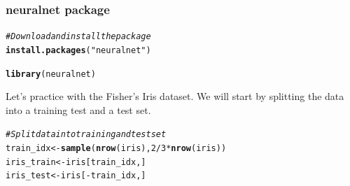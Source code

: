 \documentclass[6pt,letter]{article}\usepackage[]{graphicx}\usepackage[]{color}
\makeatletter
\newcommand{\hlnum}[1]{\textcolor[rgb]{0.686,0.059,0.569}{#1}}%
\newcommand{\hlstr}[1]{\textcolor[rgb]{0.192,0.494,0.8}{#1}}%
\newcommand{\hlcom}[1]{\textcolor[rgb]{0.678,0.584,0.686}{\textit{#1}}}%
\newcommand{\hlopt}[1]{\textcolor[rgb]{0,0,0}{#1}}%
\newcommand{\hlstd}[1]{\textcolor[rgb]{0.345,0.345,0.345}{#1}}%
\newcommand{\hlkwb}[1]{\textcolor[rgb]{0.69,0.353,0.396}{#1}}%
\newcommand{\hlkwd}[1]{\textcolor[rgb]{0.737,0.353,0.396}{\textbf{#1}}}%
\newenvironment{kframe}{%
 \def\at@end@of@kframe{}%
 \ifinner\ifhmode%
  \def\at@end@of@kframe{\end{minipage}}%
  \begin{minipage}{\columnwidth}%
 \fi\fi%
 \def\FrameCommand##1{\hskip\@totalleftmargin \hskip-\fboxsep
 \colorbox{shadecolor}{##1}\hskip-\fboxsep
     \hskip-\linewidth \hskip-\@totalleftmargin \hskip\columnwidth}%
 \MakeFramed {\advance\hsize-\width
   \@totalleftmargin\z@ \linewidth\hsize
   \@setminipage}}%
 {\par\unskip\endMakeFramed%
 \at@end@of@kframe}
\newenvironment{knitrout}{}{} %
\makeatother
\begin{document}
\subsubsection{neuralnet package}
\begin{knitrout}
\color{fgcolor}\begin{kframe}
\begin{alltt}
\hlcom{#Download and install the package}
\hlkwd{install.packages}\hlstd{(}\hlstr{"neuralnet"}\hlstd{)}
\end{alltt}


{\ttfamily\noindent\itshape\color{messagecolor}{\#\# Installing package into 'C:/Users/adrie/OneDrive/Documents/R/win-library/3.6'\\\#\# (as 'lib' is unspecified)}}

{\ttfamily\noindent\bfseries{}}\begin{alltt}
\hlkwd{library}\hlstd{(neuralnet)}
\end{alltt}
\end{kframe}
\end{knitrout}

Let's practice with the Fisher's Iris dataset. We will start by splitting the data into a training test and a test set.
\begin{knitrout}
\color{fgcolor}\begin{kframe}
\begin{alltt}
\hlcom{# Split data into training and test set}
\hlstd{train_idx} \hlkwb{<-} \hlkwd{sample}\hlstd{(}\hlkwd{nrow}\hlstd{(iris),} \hlnum{2}\hlopt{/}\hlnum{3} \hlopt{*} \hlkwd{nrow}\hlstd{(iris))}
\hlstd{iris_train} \hlkwb{<-} \hlstd{iris[train_idx, ]}
\hlstd{iris_test} \hlkwb{<-} \hlstd{iris[}\hlopt{-}\hlstd{train_idx, ]}
\end{alltt}
\end{kframe}
\end{knitrout}
\end{document}
